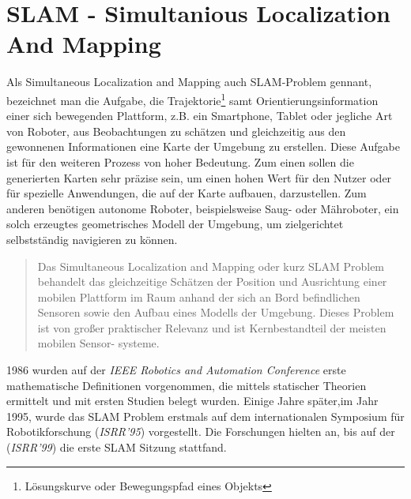 \section{SLAM - Simultanious Localization And Mapping}
\label{chap:SLAM}
Als Simultaneous Localization and Mapping auch \acs{SLAM}-Problem gennant, bezeichnet man die Aufgabe, die Trajektorie\footnote{Lösungskurve oder Bewegungspfad eines Objekts} 
samt Orientierungsinformation einer sich bewegenden Plattform, z.B. ein Smartphone, Tablet oder jegliche Art von Roboter, aus 
Beobachtungen zu schätzen und gleichzeitig aus den gewonnenen Informationen eine Karte der Umgebung zu erstellen.
Diese Aufgabe ist für den weiteren Prozess von hoher Bedeutung. Zum einen sollen die generierten Karten sehr präzise sein, um einen hohen 
Wert für den Nutzer oder für spezielle Anwendungen, die auf der Karte aufbauen, darzustellen. Zum anderen benötigen autonome Roboter, 
beispielsweise Saug- oder Mähroboter, ein solch erzeugtes geometrisches Modell der Umgebung, um zielgerichtet selbstständig navigieren zu 
können. %
\begin{quote}
    Das Simultaneous Localization and Mapping oder kurz SLAM Problem behandelt das gleichzeitige Schätzen der Position und Ausrichtung einer 
    mobilen Plattform im Raum anhand der sich an Bord befindlichen Sensoren sowie den Aufbau eines Modells der Umgebung. Dieses Problem ist 
    von großer praktischer Relevanz und ist Kernbestandteil der meisten mobilen Sensor- systeme. \cite{slamdefi.2016a}
\end{quote}
1986 wurden auf der \textit{IEEE Robotics and Automation Conference} erste mathematische Definitionen vorgenommen, die mittels statischer 
Theorien ermittelt und mit ersten Studien belegt wurden. Einige Jahre später,im Jahr 1995, wurde das \acs{SLAM} Problem erstmals auf dem 
internationalen Symposium für Robotikforschung (\textit{ISRR'95}) vorgestellt. Die Forschungen hielten an, bis auf der (\textit{ISRR'99}) 
die erste \acs{SLAM} Sitzung stattfand. 
